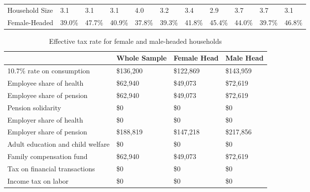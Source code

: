 \documentclass[12pt]{article}
\begin{document}
\begin{landscape}
\begin{table}[]
\begin{tabular}{lllllllllll}
Household Size                   & 3.1          & 3.1           & 3.1          & 4.0          & 3.2          & 3.4          & 2.9           & 3.7          & 3.7          & 3.1          \\
Female-Headed  & 39.0\%       & 47.7\%        & 40.9\%       & 37.8\%       & 39.3\%       & 41.8\%       & 45.4\%        & 44.0\%       & 39.7\%       & 46.8\%      \\ \hline
\end{tabular}
\end{table}

\end{landscape}


\begin{table}[]
\caption{Effective tax rate for female and male-headed households}
\label{table:tgender}
\footnotesize
\begin{tabular}{llll} \hline
&Whole Sample                                          & Female Head & Male Head        \\ \hline
10.7\% rate on consumption              & \$136,200                & \$122,869              & \$143,959   \\
Employee share of health                              & \$62,940                 & \$49,073               & \$72,619    \\
Employee share of pension                             & \$62,940                 & \$49,073               & \$72,619    \\
Pension solidarity                                    & \$0                      & \$0                    & \$0         \\
Employer share of health                              & \$0                      & \$0                    & \$0         \\
Employer share of pension                             & \$188,819                & \$147,218              & \$217,856   \\
Adult education and child welfare                     & \$0                      & \$0                    & \$0         \\
Family compensation fund                              & \$62,940                 & \$49,073               & \$72,619    \\
Tax on financial transactions                         & \$0                      & \$0                    & \$0         \\
Income tax on labor                                   & \$0                      & \$0                    & \$0         \\

\end{tabular}
\end{table}
\end{document}
